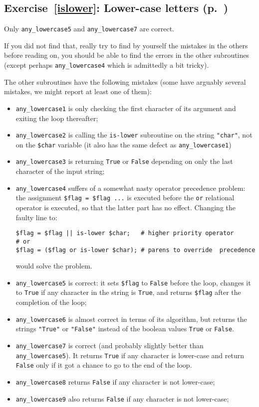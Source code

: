 \subsection{Exercise~\ref{islower}: Lower-case letters (p.~\pageref{islower})}
\label{sol_islower}

Only \verb'any_lowercase5' and \verb'any_lowercase7' are correct.

If you did not find that, really try to find by yourself the 
mistakes in the others before reading on, you should be 
able to find the errors in the other subroutines (except 
perhaps \verb'any_lowercase4' which is admittedly a bit tricky).

The other subroutines have the following mistakes (some have 
arguably several mistakes, we might report at least one of 
them):
\begin{itemize} 

\item \verb'any_lowercase1' is only checking the first 
character of its argument and exiting the loop thereafter;
\item \verb'any_lowercase2' is calling the {\tt is-lower} 
subroutine on the string {\tt "char"}, not on the 
{\tt \$char} variable (it also has the same defect as 
\verb'any_lowercase1')
\item \verb'any_lowercase3' is returning {\tt True} or 
{\tt False} depending on only the last character of the 
input string;
\item \verb'any_lowercase4' suffers of a somewhat nasty operator precedence problem: the assignment \verb'$flag = $flag ...' 
is executed before the {\tt or} relational operator is executed, 
so that the latter part has no effect. 
Changing the faulty line to:
\begin{verbatim}
$flag = $flag || is-lower $char;   # higher priority operator
# or
$flag = ($flag or is-lower $char); # parens to override  precedence
\end{verbatim}
would solve the problem.
\item \verb'any_lowercase5' is correct: it sets {\tt \$flag} 
to {\tt False} before the loop, changes it to {\tt True} if 
any character in the string is {\tt True}, and returns 
{\tt \$flag} after the completion of the loop;
\item \verb'any_lowercase6' is almost correct in terms of its 
algorithm, but returns the strings {\tt "True"} or 
{\tt "False"} instead of the boolean values {\tt True} or 
{\tt False}.
\item  \verb'any_lowercase7' is correct (and probably slightly 
better than \verb'any_lowercase5'). It returns {\tt True} if 
any character is lower-case and return {\tt False} only if 
it got a chance to go to the end of the loop.
\item  \verb'any_lowercase8' returns {\tt False} if any 
character is not lower-case;
\item  \verb'any_lowercase9' also returns {\tt False} if any 
character is not lower-case;

\end{itemize}


